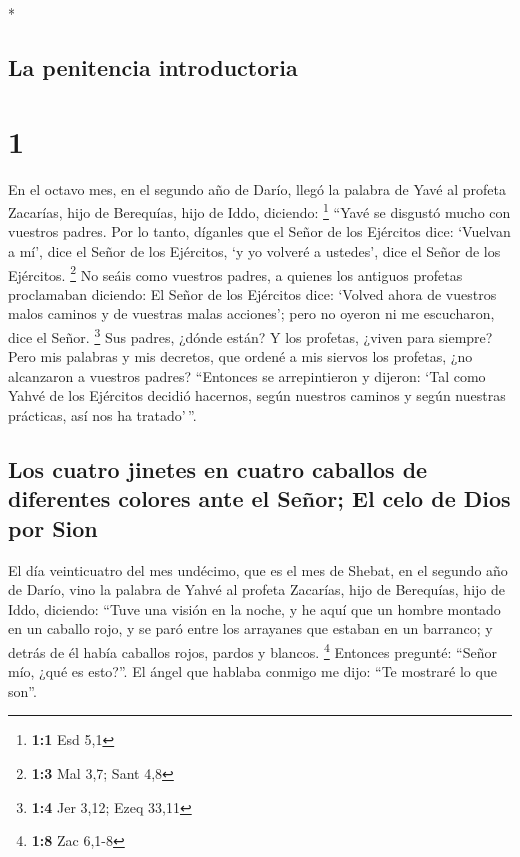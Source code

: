 \begin{paracol}{2} \switchcolumn[0]*

\hypertarget{la-penitencia-introductoria}{%
\subsection{La penitencia
introductoria}\label{la-penitencia-introductoria}}

\hypertarget{section}{%
\section{1}\label{section}}

 En el octavo mes, en el segundo año de Darío, llegó la
palabra de Yavé al profeta Zacarías, hijo de Berequías, hijo de Iddo,
diciendo: \footnote{\textbf{1:1} Esd 5,1}  ``Yavé se
disgustó mucho con vuestros padres.  Por lo tanto,
díganles que el Señor de los Ejércitos dice: `Vuelvan a mí', dice el
Señor de los Ejércitos, `y yo volveré a ustedes', dice el Señor de los
Ejércitos. \footnote{\textbf{1:3} Mal 3,7; Sant 4,8}  No
seáis como vuestros padres, a quienes los antiguos profetas proclamaban
diciendo: El Señor de los Ejércitos dice: `Volved ahora de vuestros
malos caminos y de vuestras malas acciones'; pero no oyeron ni me
escucharon, dice el Señor. \footnote{\textbf{1:4} Jer 3,12; Ezeq 33,11}
 Sus padres, ¿dónde están? Y los profetas, ¿viven para
siempre?  Pero mis palabras y mis decretos, que ordené a
mis siervos los profetas, ¿no alcanzaron a vuestros padres? ``Entonces
se arrepintieron y dijeron: `Tal como Yahvé de los Ejércitos decidió
hacernos, según nuestros caminos y según nuestras prácticas, así nos ha
tratado'\,''.

\hypertarget{los-cuatro-jinetes-en-cuatro-caballos-de-diferentes-colores-ante-el-seuxf1or-el-celo-de-dios-por-sion}{%
\subsection{Los cuatro jinetes en cuatro caballos de diferentes colores
ante el Señor; El celo de Dios por
Sion}\label{los-cuatro-jinetes-en-cuatro-caballos-de-diferentes-colores-ante-el-seuxf1or-el-celo-de-dios-por-sion}}

 El día veinticuatro del mes undécimo, que es el mes de
Shebat, en el segundo año de Darío, vino la palabra de Yahvé al profeta
Zacarías, hijo de Berequías, hijo de Iddo, diciendo: 
``Tuve una visión en la noche, y he aquí que un hombre montado en un
caballo rojo, y se paró entre los arrayanes que estaban en un barranco;
y detrás de él había caballos rojos, pardos y blancos. \footnote{\textbf{1:8}
  Zac 6,1-8}  Entonces pregunté: ``Señor mío, ¿qué es
esto?''. El ángel que hablaba conmigo me dijo: ``Te mostraré lo que
son''.


\end{paracol}
